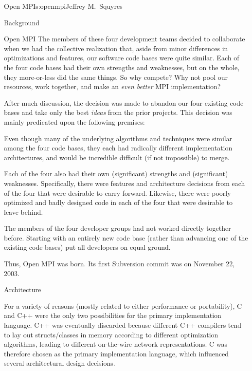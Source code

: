 \begin{aosachapter}{Open MPI}{s:openmpi}{Jeffrey M.\ Squyres}
\begin{aosasect1}{Background}
\begin{aosasect2}{Open MPI}
The members of these four development teams decided to collaborate
when we had the collective realization that, aside from minor
differences in optimizations and features, our software code bases
were quite similar.  Each of the four code bases had their own
strengths and weaknesses, but on the whole, they more-or-less did the
same things.  So why compete?  Why not pool our resources, work
together, and make an \emph{even better} MPI implementation?

After much discussion, the decision was made to abandon our four
existing code bases and take only the best \emph{ideas} from the prior
projects.  This decision was mainly predicated upon the following
premises:

\begin{aosaitemize}
\item Even though many of the underlying algorithms and techniques
  were similar among the four code bases, they each had radically
  different implementation architectures, and would be incredible
  difficult (if not impossible) to merge.
\item Each of the four also had their own (significant) strengths and
  (significant) weaknesses.  Specifically, there were features and
  architecture decisions from each of the four that were desirable to
  carry forward.  Likewise, there were poorly optimized and badly
  designed code in each of the four that were desirable to leave
  behind.
\item The members of the four developer groups had not worked directly
  together before.  Starting with an entirely new code base (rather
  than advancing one of the existing code bases) put all developers on
  equal ground.
\end{aosaitemize}

\noindent Thus, Open MPI was born.  Its first Subversion commit was on November
22, 2003.

\end{aosasect2}

\end{aosasect1}


\begin{aosasect1}{Architecture}

For a variety of reasons (mostly related to either performance or
portability), C and C++ were the only two possibilities for the
primary implementation language.  
%
C++ was eventually discarded because different C++ compilers tend to
lay out structs/classes in memory according to different optimization
algorithms, leading to different on-the-wire network representations.
%
C was therefore chosen as the primary implementation language, which
influenced several architectural design decisions.


\end{aosasect1}
\end{aosachapter}
